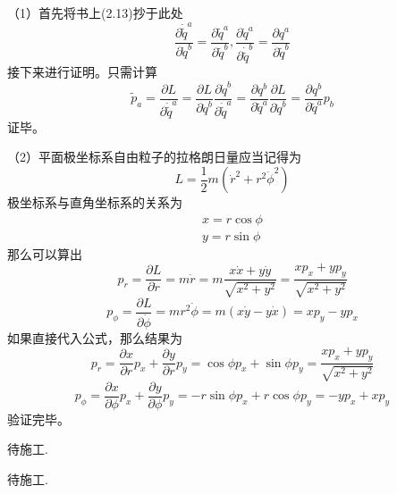 
\begin{solution}
    （1）首先将书上(2.13)抄于此处
    \[\frac{\partial\dot{\tilde{q}}^a}{\partial\dot{q}^b}=\frac{\partial\tilde{q}^a}{\partial\tilde{q}^b},\frac{\partial \dot{q}^a}{\partial \dot{\tilde{q}}^b}=\frac{\partial q^a}{\partial \tilde{q}^b}\]
    接下来进行证明。只需计算
    \[\tilde{p}_a=\frac{\partial L}{\partial \dot{\tilde{q}}^a}=\frac{\partial L}{\partial \dot{q}^b}\frac{\partial \dot{q}^b }{\partial \dot{\tilde{q}}^a}=\frac{\partial q^b}{\partial \tilde{q}^a}\frac{\partial L}{\partial \dot{q}^b}=\frac{\partial q^b}{\partial \tilde{q}^a} p_b\]
    证毕。
    
    （2）平面极坐标系自由粒子的拉格朗日量应当记得为
    \[L=\frac{1}{2}m(\dot{r}^2+r^2\dot{\phi}^2)\]
    极坐标系与直角坐标系的关系为
    \begin{align*}
    	x=r\cos{\phi}\\
    	y=r\sin{\phi}
    \end{align*}
    那么可以算出
    \[p_r=\frac{\partial L}{\partial \dot{r}}=m\dot{r}=m\frac{x\dot{x}+y\dot{y}}{\sqrt{x^2+y^2}}=\frac{x p_x+y p_y}{\sqrt{x^2+y^2}}\]
    \[p_\phi=\frac{\partial L}{\partial \dot{\phi}}=mr^2\dot{\phi}=m(x\dot{y}-y\dot{x})=x p_y-y p_x\]
    如果直接代入公式，那么结果为
    \[p_r=\frac{\partial x}{\partial r}p_x+\frac{\partial y}{\partial r}p_y=\cos{\phi}p_x+\sin{\phi}p_y=\frac{x p_x+y p_y}{\sqrt{x^2+y^2}}\]
    \[p_\phi=\frac{\partial x}{\partial \phi}p_x+\frac{\partial y}{\partial \phi}p_y=-r\sin{\phi}p_x+r\cos{\phi}p_y=-y p_x+x p_y\]
    验证完毕。
\end{solution}


\problem{}
\begin{solution}
    待施工.
\end{solution}



\problem{}
\begin{solution}
    待施工.
\end{solution}



